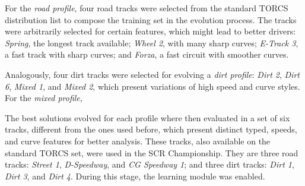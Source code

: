 For the \emph{road profile}, four road tracks were selected from the standard TORCS distribution list to compose the training set in the evolution process. The tracks were arbitrarily selected for certain features, which might lead to better drivers: \emph{Spring}, the longest track available; \emph{Wheel 2}, with many sharp curves; \emph{E-Track 3}, a fast track with sharp curves; and \emph{Forza}, a fast circuit with smoother curves.

Analogously, four dirt tracks were selected for evolving a \emph{dirt profile}: \emph{Dirt 2}, \emph{Dirt 6}, \emph{Mixed 1}, and \emph{Mixed 2}, which present variations of high speed and curve styles. For the \emph{mixed profile}, 


The best solutions evolved for each profile where then evaluated in a set of six tracks, different from the ones used before, which present distinct typed, speeds, and curve features for better analysis. These tracks, also available on the standard TORCS set, were used in the  SCR Championship. They are three road tracks: \emph{Street 1}, \emph{D-Speedway}, and \emph{CG Speedway 1}; and three dirt tracks: \emph{Dirt 1}, \emph{Dirt 3}, and \emph{Dirt 4}. During this stage, the learning module was enabled.


